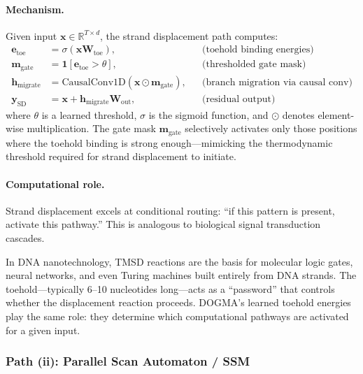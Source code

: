 \paragraph{Mechanism.} Given input $\mathbf{x} \in \mathbb{R}^{T \times d}$, the strand displacement path computes:
\begin{align}
\mathbf{e}_{\text{toe}} &= \sigma(\mathbf{x} \mathbf{W}_{\text{toe}}), && \text{(toehold binding energies)} \label{eq:toehold} \\
\mathbf{m}_{\text{gate}} &= \mathbf{1}[\mathbf{e}_{\text{toe}} > \theta], && \text{(thresholded gate mask)} \\
\mathbf{h}_{\text{migrate}} &= \mathrm{CausalConv1D}(\mathbf{x} \odot \mathbf{m}_{\text{gate}}), && \text{(branch migration via causal conv)} \\
\mathbf{y}_{\text{SD}} &= \mathbf{x} + \mathbf{h}_{\text{migrate}} \mathbf{W}_{\text{out}}, && \text{(residual output)}
\end{align}
where $\theta$ is a learned threshold, $\sigma$ is the sigmoid function, and $\odot$ denotes element-wise multiplication. The gate mask $\mathbf{m}_{\text{gate}}$ selectively activates only those positions where the toehold binding is strong enough---mimicking the thermodynamic threshold required for strand displacement to initiate.

\paragraph{Computational role.} Strand displacement excels at conditional routing: ``if this pattern is present, activate this pathway.'' This is analogous to biological signal transduction cascades.

\begin{bioinsight}
In DNA nanotechnology, TMSD reactions are the basis for molecular logic gates, neural networks, and even Turing machines built entirely from DNA strands. The toehold---typically 6--10 nucleotides long---acts as a ``password'' that controls whether the displacement reaction proceeds. DOGMA's learned toehold energies play the same role: they determine which computational pathways are activated for a given input.
\end{bioinsight}

\subsubsection{Path (ii): Parallel Scan Automaton / SSM}
\label{sec:path-parallel-scan}

